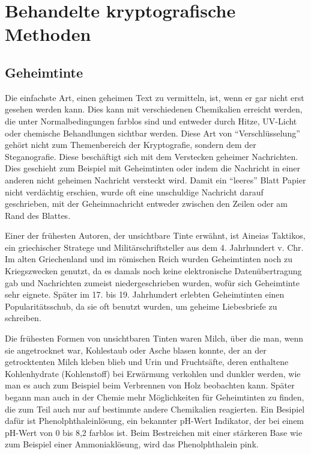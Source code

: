 \section{Behandelte kryptografische Methoden}

\subsection{Geheimtinte}

Die einfachste Art, einen geheimen Text zu vermitteln, ist, wenn er gar nicht erst gesehen werden kann. Dies kann mit verschiedenen Chemikalien erreicht werden, die unter Normalbedingungen farblos sind und entweder durch Hitze, UV-Licht oder chemische Behandlungen sichtbar werden. Diese Art von \enquote{Verschlüsselung} gehört nicht zum Themenbereich der Kryptografie, sondern dem der Steganografie. Diese beschäftigt sich mit dem Verstecken geheimer Nachrichten. Dies geschieht zum Beispiel mit Geheimtinten oder indem die Nachricht in einer anderen nicht geheimen Nachricht versteckt wird. Damit ein \enquote{leeres} Blatt Papier nicht verdächtig erschien, wurde oft eine unschuldige Nachricht darauf geschrieben, mit der Geheimnachricht entweder zwischen den Zeilen oder am Rand des Blattes.

Einer der frühesten Autoren, der unsichtbare Tinte erwähnt, ist Aineias Taktikos, ein griechischer Stratege und Militärschriftsteller aus dem 4. Jahrhundert v. Chr. Im alten Griechenland und im römischen Reich wurden Geheimtinten noch zu Kriegszwecken genutzt, da es damals noch keine elektronische Datenübertragung gab und Nachrichten zumeist niedergeschrieben wurden, wofür sich Geheimtinte sehr eignete. Später im 17. bis 19. Jahrhundert erlebten Geheimtinten einen Popularitätsschub, da sie oft benutzt wurden, um geheime Liebesbriefe zu schreiben.

Die frühesten Formen von unsichtbaren Tinten waren Milch, über die man, wenn sie angetrocknet war, Kohlestaub oder Asche blasen konnte, der an der getrocktenten Milch kleben blieb und Urin und Fruchtsäfte, deren enthaltene Kohlenhydrate (Kohlenstoff) bei Erwärmung verkohlen und dunkler werden, wie man es auch zum Beispiel beim Verbrennen von Holz beobachten kann. Später begann man auch in der Chemie mehr Möglichkeiten für Geheimtinten zu finden, die zum Teil auch nur auf bestimmte andere Chemikalien reagierten. Ein Besipiel dafür ist Phenolphthaleinlösung, ein bekannter pH-Wert Indikator, der bei einem pH-Wert von 0 bis 8,2 farblos ist. Beim Bestreichen mit einer stärkeren Base wie zum Beispiel einer Ammoniaklösung, wird das Phenolphthalein pink.

